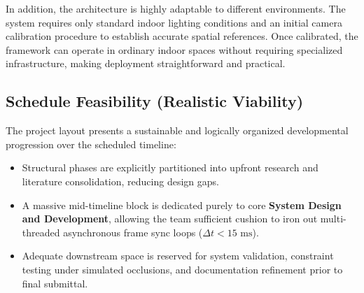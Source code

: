 In addition, the architecture is highly adaptable to different environments. The system requires only standard indoor lighting conditions and an initial camera calibration procedure to establish accurate spatial references. Once calibrated, the framework can operate in ordinary indoor spaces without requiring specialized infrastructure, making deployment straightforward and practical.

\subsection{Schedule Feasibility (Realistic Viability)}
The project layout presents a sustainable and logically organized developmental progression over the scheduled timeline:
\begin{itemize}
    \item Structural phases are explicitly partitioned into upfront research and literature consolidation, reducing design gaps.
    \item A massive mid-timeline block is dedicated purely to core \textbf{System Design and Development}, allowing the team sufficient cushion to iron out multi-threaded asynchronous frame sync loops ($\Delta t < 15\text{ ms}$).
    \item Adequate downstream space is reserved for system validation, constraint testing under simulated occlusions, and documentation refinement prior to final submittal.
\end{itemize}

